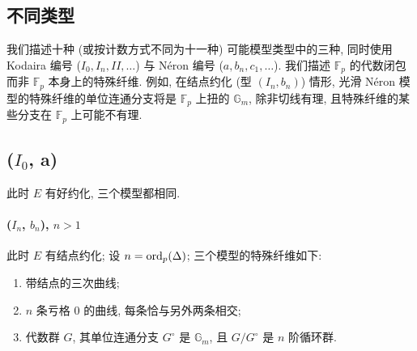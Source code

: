 \subsection*{不同类型}

我们描述十种 (或按计数方式不同为十一种) 可能模型类型中的三种, 同时使用 Kodaira 编号 ($I_0, I_n, II, \dots$) 与 N\'eron 编号 ($a, b_n, c_1, \dots$). 我们描述 $\mathbb{F}_p$ 的代数闭包而非 $\mathbb{F}_p$ 本身上的特殊纤维. 例如, 在结点约化 (型 $(I_n, b_n)$) 情形, 光滑 N\'eron 模型的特殊纤维的单位连通分支将是 $\mathbb{F}_p$ 上扭的 $\mathbb{G}_m$, 除非切线有理, 且特殊纤维的某些分支在 $\mathbb{F}_p$ 上可能不有理.

\subsection*{($I_0$, a)} 此时 $E$ 有好约化, 三个模型都相同.

\paragraph*{($I_n$, $b_n$), $n>1$} 此时 $E$ 有结点约化; 设 $n = \operatorname*{ord}\nolimits_p(\Delta)$; 三个模型的特殊纤维如下:
\begin{enumerate}[label=\textup{(\alph*)}]
\item 带结点的三次曲线;
\item $n$ 条亏格 $0$ 的曲线, 每条恰与另外两条相交;
\item 代数群 $G$, 其单位连通分支 $G^\circ$ 是 $\mathbb{G}_m$, 且 $G/G^\circ$ 是 $n$ 阶循环群.
\end{enumerate}

